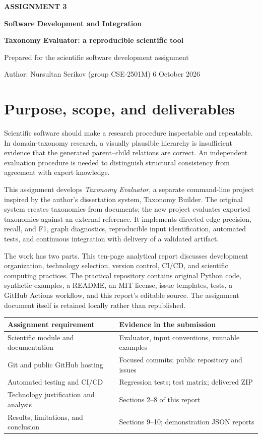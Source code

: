 \documentclass[12pt,a4paper]{article}
\begin{document}
\begin{center}
\textbf{ASSIGNMENT 3}\par
\textbf{Software Development and Integration}\par
\textbf{Taxonomy Evaluator: a reproducible scientific tool}\par
Prepared for the scientific software development assignment\par
Author: Nursultan Serikov (group CSE-2501M) \hfill 6 October 2026
\end{center}

\section{Purpose, scope, and deliverables}
Scientific software should make a research procedure inspectable and repeatable. In domain-taxonomy research, a visually plausible hierarchy is insufficient evidence that the generated parent--child relations are correct. An independent evaluation procedure is needed to distinguish structural consistency from agreement with expert knowledge.

This assignment develops \textit{Taxonomy Evaluator}, a separate command-line project inspired by the author's dissertation system, Taxonomy Builder. The original system creates taxonomies from documents; the new project evaluates exported taxonomies against an external reference. It implements directed-edge precision, recall, and F1, graph diagnostics, reproducible input identification, automated tests, and continuous integration with delivery of a validated artifact.

The work has two parts. This ten-page analytical report discusses development organization, technology selection, version control, CI/CD, and scientific computing practices. The practical repository contains original Python code, synthetic examples, a README, an MIT license, issue templates, tests, a GitHub Actions workflow, and this report's editable source. The assignment document itself is retained locally rather than republished.

\noindent\begin{tabularx}{\textwidth}{|p{4.7cm}|X|}\hline
\textbf{Assignment requirement} & \textbf{Evidence in the submission} \\\hline
Scientific module and documentation & Evaluator, input conventions, runnable examples \\\hline
Git and public GitHub hosting & Focused commits; public repository and issues \\\hline
Automated testing and CI/CD & Regression tests; test matrix; delivered ZIP \\\hline
Technology justification and analysis & Sections 2--8 of this report \\\hline
Results, limitations, and conclusion & Sections 9--10; demonstration JSON reports \\\hline
\end{tabularx}
\end{document}

